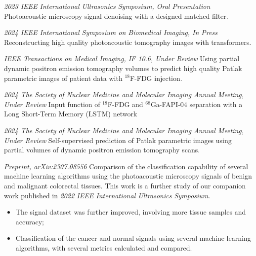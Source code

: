\documentclass{resume}
\begin{document}
\textit{2023 IEEE International Ultrasonics Symposium, Oral Presentation}
Photoacoustic microscopy signal denoising with a designed matched filter.

\textit{2024 IEEE International Symposium on Biomedical Imaging, In Press}
Reconstructing high quality photoacoustic tomography images with transformers.

\textit{IEEE Transactions on Medical Imaging, IF 10.6, Under Review}
Using partial dynamic positron emission tomography volumes to predict high quality Patlak parametric images of patient data with $^{18}$F-FDG injection.

\textit{2024 The Society of Nuclear Medicine and Molecular Imaging Annual Meeting, Under Review}
Input function of $^{18}$F-FDG and $^{68}$Ga-FAPI-04 separation with a Long Short-Term Memory (LSTM) network

\textit{2024 The Society of Nuclear Medicine and Molecular Imaging Annual Meeting, Under Review}
Self-supervised prediction of Patlak parametric images using partial volumes of dynamic positron emission tomography scans.

\textit{Preprint, arXiv:2307.08556}
Comparison of the classification capability of several machine learning algorithms using the photoacoustic microscopy signals of benign and malignant colorectal tissues. This work is a further study of our companion work published in \textit{2022 IEEE International Ultrasonics Symposium}.
\begin{itemize}
  \item The signal dataset was further improved, involving more tissue samples and accuracy;
  \item Classification of the cancer and normal signals using several machine learning algorithms, with several metrics calculated and compared.
\end{itemize}
\end{document}
